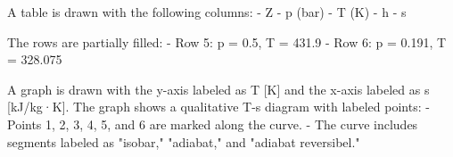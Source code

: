 A table is drawn with the following columns:  
- Z  
- p (bar)  
- T (K)  
- h  
- s  

The rows are partially filled:  
- Row 5: p = 0.5, T = 431.9  
- Row 6: p = 0.191, T = 328.075  

A graph is drawn with the y-axis labeled as T [K] and the x-axis labeled as s [kJ/kg·K].  
The graph shows a qualitative T-s diagram with labeled points:  
- Points 1, 2, 3, 4, 5, and 6 are marked along the curve.  
- The curve includes segments labeled as "isobar," "adiabat," and "adiabat reversibel."